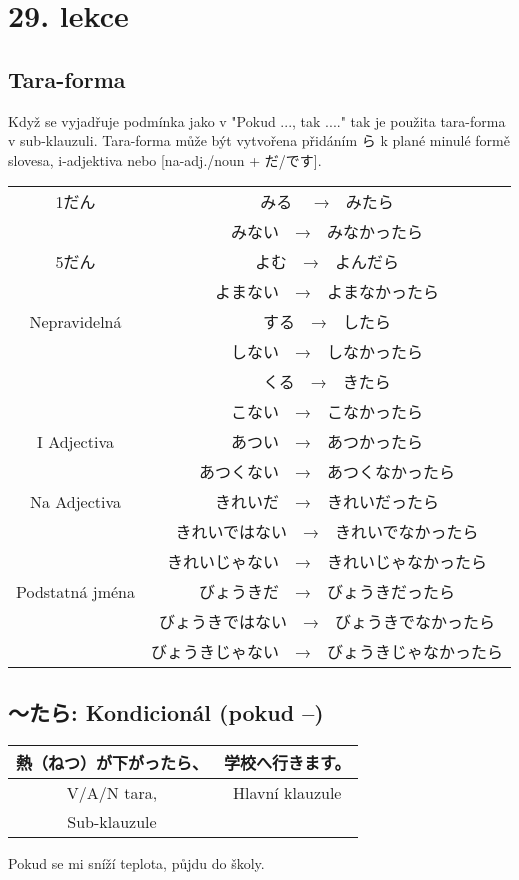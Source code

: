\section{29. lekce}
\label{sec:lekce_29}


\subsection{Tara-forma}
Když se vyjadřuje podmínka jako v "Pokud ..., tak ...." tak je použita tara-forma v sub-klauzuli. Tara-forma může být vytvořena přidáním ら k plané minulé formě slovesa, i-adjektiva nebo  [na-adj./noun + だ/です].


\begin{center}
\begin{tabular}{|| c || c ||}
\hline
1だん&みる 　→　みたら \\
 &みない　→　みなかったら　\\
\hline
5だん&よむ　→　よんだら\\
&よまない　→　よまなかったら\\
\hline
Nepravidelná &する　→　したら \\
&しない　→　しなかったら\\
&くる　→　きたら\\
&こない　→　こなかったら\\
\hline
I Adjectiva&あつい　→　あつかったら \\
&あつくない　→　あつくなかったら\\
\hline
Na Adjectiva&きれいだ　→　きれいだったら \\
&きれいではない　→　きれいでなかったら\\
&きれいじゃない　→　きれいじゃなかったら\\
\hline
Podstatná jména&びょうきだ　→　びょうきだったら\\
&びょうきではない　→　びょうきでなかったら\\
&びょうきじゃない　→　びょうきじゃなかったら\\
\hline
\end{tabular}
\end{center}

\subsection{〜たら: Kondicionál (pokud --)}

\begin{center}
\begin{tabular}{|| c || c ||}
\hline
熱（ねつ）が下がったら、&学校へ行きます。\\
\hline
V/A/N tara,& Hlavní klauzule\\
Sub-klauzule&\\
\hline
\end{tabular}
\end{center}
Pokud se mi sníží teplota, půjdu do školy.

